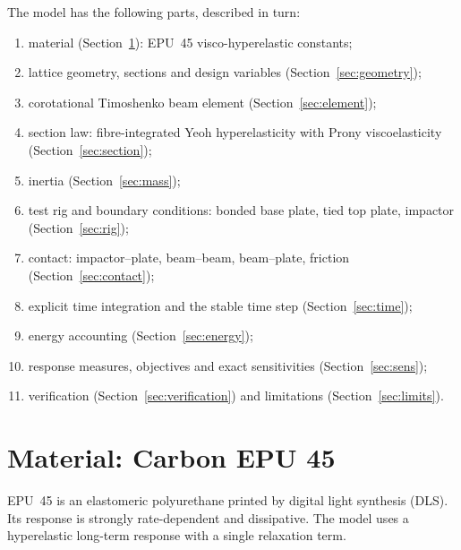 \documentclass[11pt,a4paper]{article}
\begin{document}
The model has the following parts, described in turn:
\begin{enumerate}
\item material (Section~\ref{sec:material}): EPU~45 visco-hyperelastic constants;
\item lattice geometry, sections and design variables (Section~\ref{sec:geometry});
\item corotational Timoshenko beam element (Section~\ref{sec:element});
\item section law: fibre-integrated Yeoh hyperelasticity with Prony viscoelasticity (Section~\ref{sec:section});
\item inertia (Section~\ref{sec:mass});
\item test rig and boundary conditions: bonded base plate, tied top plate, impactor (Section~\ref{sec:rig});
\item contact: impactor--plate, beam--beam, beam--plate, friction (Section~\ref{sec:contact});
\item explicit time integration and the stable time step (Section~\ref{sec:time});
\item energy accounting (Section~\ref{sec:energy});
\item response measures, objectives and exact sensitivities (Section~\ref{sec:sens});
\item verification (Section~\ref{sec:verification}) and limitations (Section~\ref{sec:limits}).
\end{enumerate}

\section{Material: Carbon EPU 45}
\label{sec:material}
EPU~45 is an elastomeric polyurethane printed by digital light synthesis (DLS). Its response is strongly
rate-dependent and dissipative. The model uses a hyperelastic long-term response with a single relaxation term.
\end{document}
